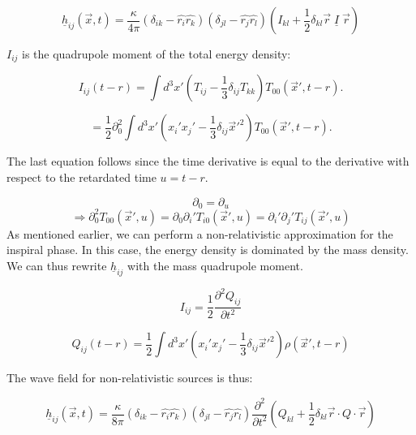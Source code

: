 \begin{equation}
    \underline{h}_{ij}(\vec{x}, t)=\frac{\kappa}{4\pi}(\delta_{ik}-\hat{r_i}\hat{r_k})(\delta_{jl}-\hat{r_j}\hat{r_l})\left(I_{kl}+\frac{1}{2}\delta_{kl}\vec{r}\; \underline{I} \; \vec{r}\right)
\end{equation}

$I_{ij}$ is the quadrupole moment of the total energy density:

\begin{equation}
    I_{ij}(t-r)= \int d^3x' \left(T_{ij} -\frac{1}{3}\delta_{ij}T_{kk} \right)T_{00}(\vec{x}', t-r) .
\end{equation}

\begin{equation}
    = \frac{1}{2} \partial_0^2 \int d^3x' \left(x_i' x_j' -\frac{1}{3}\delta_{ij}\vec{x}'^2 \right)T_{00}(\vec{x}', t-r) .
\end{equation}

The last equation follows since the time derivative is equal to the derivative with respect to the retardated time $u=t-r$.

\begin{equation}
    \partial_0 = \partial_u
\end{equation}
\begin{equation}
    \Rightarrow \partial_0^2T_{00}(\vec{x}', u) = \partial_0 \partial_i' T_{i0}(\vec{x}', u) = \partial_i'\partial_j' T_{ij}(\vec{x}', u)
\end{equation}
As mentioned earlier, we can perform a non-relativistic approximation for the inspiral phase. In this case, the energy density is dominated by the mass density. We can thus rewrite $\underline{h}_{ij}$ with the mass quadrupole moment. 


\begin{equation}
    I_{ij}=\frac{1}{2}\frac{\partial^2 Q_{ij}}{{\partial t^2}}
\end{equation}

\begin{equation}
    Q_{ij}(t-r)=\frac{1}{2} \int d^3x' \left(x_i' x_j' -\frac{1}{3}\delta_{ij}\vec{x}'^2 \right)\rho(\vec{x}', t-r)
\end{equation}



The wave field for non-relativistic sources is thus:

\begin{equation}
    \underline{h}_{ij}(\vec{x}, t)=\frac{\kappa}{8\pi}(\delta_{ik}-\hat{r_i}\hat{r_k})(\delta_{jl}-\hat{r_j}\hat{r_l})\frac{\partial^2}{\partial t^2}\left(Q_{kl}+\frac{1}{2}\delta_{kl}\vec{r}\cdot Q \cdot \vec{r}\right)
\end{equation}

